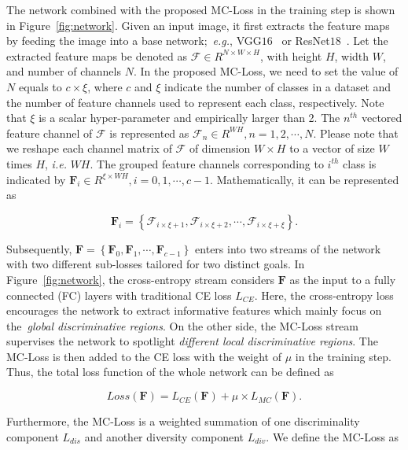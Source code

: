 \documentclass[journal]{IEEEtran}
\begin{document}
The network combined with the proposed MC-Loss in the training step is shown in Figure~\ref{fig:network}. Given an input image, it first extracts the feature maps by feeding the image into a base network;~\emph{e.g.}, VGG$16$~\cite{simonyan2014very} or ResNet$18$~\cite{he2016deep}. Let the extracted feature maps be denoted as $\mathcal{F} \in R^{N\times W\times H}$, with height $H$, width $W$,  and number of channels $N$. In the proposed MC-Loss, we need to set the value of $N$ equals to $c\times\xi$, where $c$ and $\xi$ indicate the number of classes in a dataset and the number of feature channels used to represent each class, respectively. Note that $\xi$ is a scalar hyper-parameter and empirically larger than 2. The  $n^{th}$ vectored feature channel of $\mathcal{F}$ is represented as $\mathcal{F}_n\in R^{W\!H}, n=1,2,\cdots,N$. Please note that we reshape each channel matrix of $\mathcal{F}$ of dimension $W\times H$ to a vector of size $W$ \!times $H$, \emph{i.e.} $W\!H$. The grouped feature channels corresponding to $i^{th}$ class is indicated by $\mathbf{F}_i\in R^{\xi\times W\!H}, i=0,1,\cdots,c-1$. Mathematically, it can be represented as

\begin{equation}
  \mathbf{F}_i=\left\{\mathcal{F}_{i\times\xi +1}, \mathcal{F}_{i\times\xi +2}, \cdots, \mathcal{F}_{i\times\xi+\xi}\right\}.
\end{equation}



Subsequently, $\mathbf{F}=\left\{\mathbf{F}_0,\mathbf{F}_1,\cdots,\mathbf{F}_{c-1}\right\}$ enters into two streams of the network with two different sub-losses tailored for two distinct goals. In Figure~\ref{fig:network}, the cross-entropy stream considers $\mathbf{F}$ as the input to a fully connected (FC) layers with traditional CE loss $L_{CE}$. Here, the cross-entropy loss encourages the network to extract informative features which mainly focus on the~\emph{global discriminative regions}. On the other side, the MC-Loss stream supervises the network to spotlight \emph{different local discriminative regions}. The MC-Loss is then added to the CE loss with the weight of $\mu$ in the training step. Thus, the total loss function of the whole network can be defined as

\begin{equation}
  Loss(\mathbf{F})=L_{CE}(\mathbf{F})+\mu\times L_{MC}(\mathbf{F}).
 \label{total_loss}
\end{equation}

Furthermore, the MC-Loss is a weighted summation of one discriminality  component ${L}_{dis}$ and  another  diversity component ${L}_{div}$. We define the MC-Loss as
\end{document}
